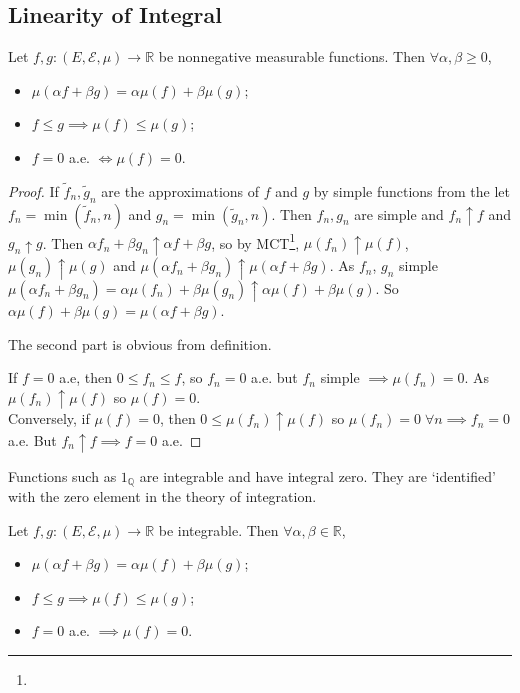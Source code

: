 \subsection{Linearity of Integral}
\begin{theorem}
	Let $f, g \colon (E, \mathcal E, \mu) \to \mathbb R$ be nonnegative measurable functions.
	Then $\forall \alpha, \beta \geq 0$,
	\begin{itemize}
		\item $\mu(\alpha f + \beta g) = \alpha \mu(f) + \beta \mu(g)$;
		\item $f \leq g \implies \mu(f) \leq \mu(g)$;
		\item $f = 0$ a.e. $\iff \mu(f) = 0$.
	\end{itemize}
\end{theorem}

\begin{proof}
	If $\widetilde f_n, \widetilde g_n$ are the approximations of $f$ and $g$ by simple functions from the  let $f_n = \min(\widetilde f_n, n)$ and $g_n = \min(\widetilde g_n, n)$.
	Then $f_n, g_n$ are simple and $f_n \uparrow f$ and $g_n \uparrow g$.
	Then $\alpha f_n + \beta g_n \uparrow \alpha f + \beta g$, so by MCT\footnote{}, $\mu(f_n) \uparrow \mu(f)$, $\mu(g_n) \uparrow \mu(g)$ and $\mu(\alpha f_n + \beta g_n) \uparrow \mu(\alpha f + \beta g)$.
	As $f_n$, $g_n$ simple $\mu(\alpha f_n + \beta g_n) = \alpha \mu(f_n) + \beta \mu(g_n) \uparrow \alpha \mu(f) + \beta \mu(g)$.
	So $\alpha \mu(f) + \beta \mu(g) = \mu(\alpha f + \beta g)$.

	The second part is obvious from definition.

	If $f = 0$ a.e, then $0 \leq f_n \leq f$, so $f_n = 0$ a.e. but $f_n$ simple $\implies \mu(f_n) = 0$.
	As $\mu(f_n) \uparrow \mu(f)$ so $\mu(f) = 0$. \\
	Conversely, if $\mu(f) = 0$, then $0 \leq \mu(f_n) \uparrow \mu(f)$ so $\mu(f_n) = 0 \; \forall n \implies f_n = 0$ a.e.
	But $f_n \uparrow f \implies f = 0$ a.e.
\end{proof}

\begin{remark}
	Functions such as $1_{\mathbb Q}$ are integrable and have integral zero.
	They are `identified' with the zero element in the theory of integration.
\end{remark}

\begin{theorem}
	Let $f, g \colon (E, \mathcal E, \mu) \to \mathbb R$ be integrable.
	Then $\forall \alpha, \beta \in \mathbb{R}$,
	\begin{itemize}
		\item $\mu(\alpha f + \beta g) = \alpha \mu(f) + \beta \mu(g)$;
		\item $f \leq g \implies \mu(f) \leq \mu(g)$;
		\item $f = 0$ a.e. $\implies \mu(f) = 0$.
	\end{itemize}
\end{theorem}

